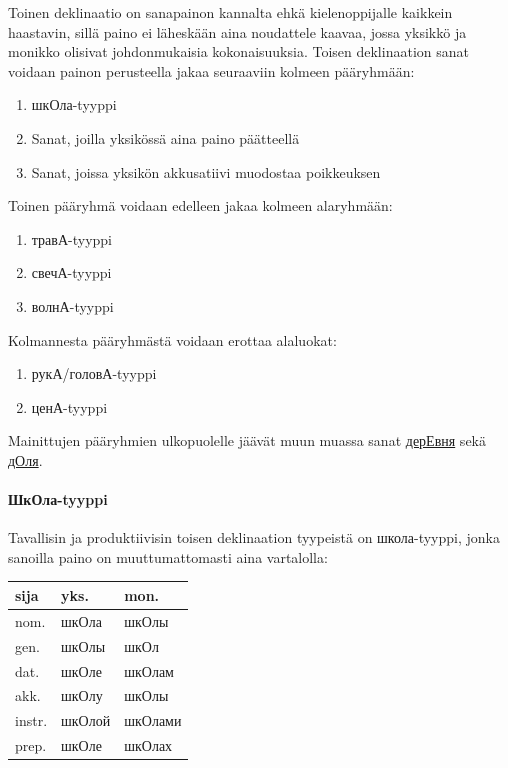 \documentclass[]{scrartcl}
\providecommand{\tightlist}{%
  \setlength{\itemsep}{0pt}\setlength{\parskip}{0pt}}
\begin{document}
Toinen deklinaatio on sanapainon kannalta ehkä kielenoppijalle kaikkein
haastavin, sillä paino ei läheskään aina noudattele kaavaa, jossa
yksikkö ja monikko olisivat johdonmukaisia kokonaisuuksia. Toisen
deklinaation sanat voidaan painon perusteella jakaa seuraaviin kolmeen
pääryhmään:

\begin{enumerate}
\def\labelenumi{\arabic{enumi}.}
\tightlist
\item
  шкОла-tyyppi
\item
  Sanat, joilla yksikössä aina paino päätteellä
\item
  Sanat, joissa yksikön akkusatiivi muodostaa poikkeuksen
\end{enumerate}

Toinen pääryhmä voidaan edelleen jakaa kolmeen alaryhmään:

\begin{enumerate}
\def\labelenumi{\alph{enumi})}
\tightlist
\item
  травА-tyyppi
\item
  свечА-tyyppi
\item
  волнА-tyyppi
\end{enumerate}

Kolmannesta pääryhmästä voidaan erottaa alaluokat:

\begin{enumerate}
\def\labelenumi{\alph{enumi})}
\tightlist
\item
  рукА/головА-tyyppi
\item
  ценА-tyyppi
\end{enumerate}

Mainittujen pääryhmien ulkopuolelle jäävät muun muassa sanat
\href{http://ru.wiktionary.org/wiki/\%D0\%B4\%D0\%B5\%D1\%80\%D0\%B5\%D0\%B2\%D0\%BD\%D1\%8F}{дерЕвня}
sekä
\href{http://ru.wiktionary.org/wiki/\%D0\%B4\%D0\%BE\%D0\%BB\%D1\%8F}{дОля}.

\paragraph{ШкОла-tyyppi}\label{ux448ux43aux43eux43bux430-tyyppi}

Tavallisin ja produktiivisin toisen deklinaation tyypeistä on
школа-tyyppi, jonka sanoilla paino on muuttumattomasti aina vartalolla:

\begin{longtable}[c]{@{}lll@{}}
\toprule
sija & yks. & mon.\tabularnewline
\midrule
\endhead
nom. & шкОла & шкОлы\tabularnewline
gen. & шкОлы & шкОл\tabularnewline
dat. & шкОле & шкОлам\tabularnewline
akk. & шкОлу & шкОлы\tabularnewline
instr. & шкОлой & шкОлами\tabularnewline
prep. & шкОле & шкОлах\tabularnewline
\bottomrule
\end{longtable}
\end{document}
